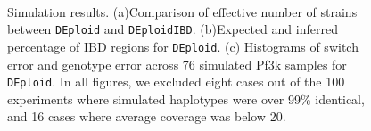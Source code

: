 \documentclass[9pt,lineno]{elife}
\begin{document}
\begin{figure}[htp]
  \begin{center}
  \\
  \caption{Simulation results. (a)Comparison of effective number of strains between \texttt{DEploid} and \texttt{DEploidIBD}. (b)Expected and inferred percentage of IBD regions for \texttt{DEploid}. (c) Histograms of switch error and genotype error across 76 simulated Pf3k samples for \texttt{DEploid}. In all figures, we excluded eight cases out of the 100 experiments where simulated haplotypes were over 99\% identical, and 16 cases where average coverage was below 20.
}
\end{center}
\end{figure}
\end{document}
